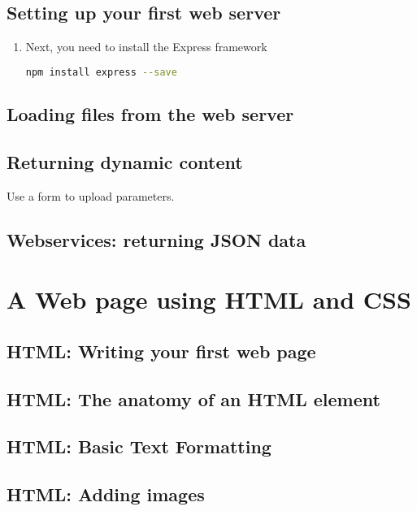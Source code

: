 \documentclass[12pt,a5paper]{book}
\begin{document}
\chapter{Setting up your first web server}

\begin{enumerate}
\item Next, you need to install the Express framework

\begin{lstlisting}[language=bash]
    npm install express --save
\end{lstlisting}

\end{enumerate}

\chapter{Loading files from the web server}

\chapter{Returning dynamic content}

Use a form to upload parameters.

\chapter{Webservices: returning JSON data}

\part{A Web page using HTML and CSS}

\chapter{HTML: Writing your first web page}

\chapter{HTML: The anatomy of an HTML element}

\chapter{HTML: Basic Text Formatting}

\chapter{HTML: Adding images}
\end{document}
